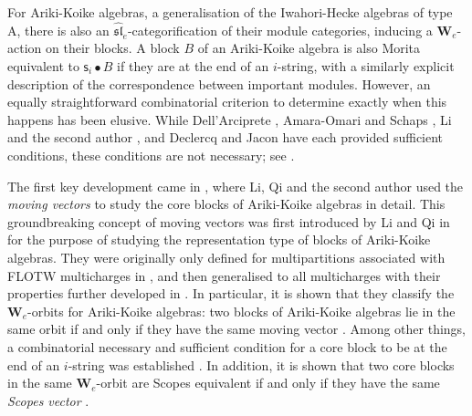 \documentclass[11pt,a4paper,reqno]{amsart}
\numberwithin{equation}{section}
\theoremstyle{plain}
\theoremstyle{definition}
\theoremstyle{remark}
\numberwithin{equation}{section}
\newcommand{\cs}{\mathsf{s}}
\newcommand{\AW}{\mathbf{W}}
\newcommand{\DDot}[1]{\mathrel{\overset{#1}{\bullet}}}
\begin{document}
For Ariki-Koike algebras, a generalisation of the Iwahori-Hecke algebras of type A, there is also an $\widehat{\mathfrak{sl}}_e$-categorification of their module categories, inducing a $\AW_e$-action on their blocks.
A block $B$ of an Ariki-Koike algebra is also Morita equivalent to $\cs_i \DDot{} B$ if they are at the end of an $i$-string, with a similarly explicit description of the correspondence between important modules.
However, an equally straightforward combinatorial criterion to determine exactly when this happens has been elusive.
While Dell'Arciprete \cite{D}, Amara-Omari and Schaps \cite{AM-S}, Li and the second author \cite{LT}, and Declercq and Jacon \cite{DJ} have each provided sufficient conditions, these conditions are not necessary; see \cite[Example 4.14 and Remark 4.15]{LT}. 

The first key development came in \cite{LQT}, where Li, Qi and the second author used the {\em moving vectors} to study the core blocks of Ariki-Koike algebras in detail.
This groundbreaking concept of moving vectors was first introduced by Li and Qi in \cite{LQ}
for the purpose of studying the representation type of blocks of Ariki-Koike algebras.
They were originally only defined for multipartitions associated with FLOTW multicharges in \cite{LQ}, and then generalised to all multicharges with their properties further developed in \cite{LQT}.
In particular, it is shown that they classify the $\AW_e$-orbits for Ariki-Koike algebras: two blocks of Ariki-Koike algebras lie in the same orbit if and only if they have the same moving vector \cite[Proposition 3.13]{LQT}.
Among other things, a combinatorial necessary and sufficient condition for a core block to be at the end of an $i$-string was established \cite[Lemma 4.8 and Proposition 4.23]{LQT}.  In addition, it is shown that two core blocks in the same $\AW_e$-orbit are Scopes equivalent if and only if they have the same {\em Scopes vector} \cite[Theorem 4.24]{LQT}.
\end{document}
